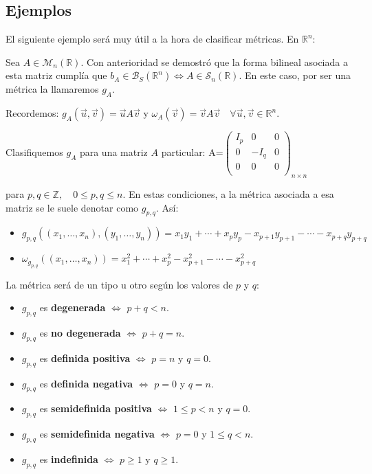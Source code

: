 \documentclass[x11names,table]{report}
\begin{document}
\subsection{Ejemplos}
El siguiente ejemplo será muy útil a la hora de clasificar métricas.
En $\mathbb{R}^n$:

Sea $A\in\mathcal{M}_n(\mathbb{R})$. Con anterioridad se demostró que la forma bilineal asociada a esta matriz cumplía que $b_A\in\mathcal{B}_S(\mathbb{R}^n)\Leftrightarrow A\in\mathcal{S}_n(\mathbb{R})$. En este caso, por ser una métrica la llamaremos $g_A$.

Recordemos: $g_A(\vec{u},\vec{v})=\vec{u}A\vec{v}$ y $\omega_A(\vec{v})=\vec{v}A\vec{v}\quad\forall\vec{u},\vec{v}\in \mathbb{R}^n$.

Clasifiquemos $g_A$ para una matriz $A$ particular:
A=$\left(\begin{array}{c|c|c}
I_p & 0 & 0 \\ \hline
0 & -I_q & 0 \\ \hline
0 & 0 & 0 \\
\end{array}\right)_{n\times n}$

para $p,q\in\mathbb{Z},\quad 0\leq p,q \leq n$. En estas condiciones, a la métrica asociada a esa matriz se le suele denotar como $g_{p,q}$. Así:
\begin{itemize}
\item $g_{p,q}((x_1,\dots,x_n),(y_1,\dots,y_n))=x_1 y_1+\cdots+x_p y_p-x_{p+1} y_{p+1}-\cdots-x_{p+q} y_{p+q}$
\item $\omega_{g_{p,q}}((x_1,\dots,x_n))=x_1^2+\cdots+x_p^2-x_{p+1}^2-\cdots-x_{p+q}^2$
\end{itemize}
La métrica será de un tipo u otro según los valores de $p$ y $q$:
\begin{itemize}
\item $g_{p,q}$ es \textbf{degenerada} $\Leftrightarrow$ $p+q<n$.
\item $g_{p,q}$ es \textbf{no degenerada} $\Leftrightarrow$ $p+q=n$.
\item $g_{p,q}$ es \textbf{definida positiva} $\Leftrightarrow$ $p=n$ y $q=0$.
\item $g_{p,q}$ es \textbf{definida negativa} $\Leftrightarrow$ $p=0$ y $q=n$.
\item $g_{p,q}$ es \textbf{semidefinida positiva} $\Leftrightarrow$ $1\leq p< n$ y $q=0$.
\item $g_{p,q}$ es \textbf{semidefinida negativa} $\Leftrightarrow$ $p=0$ y $1\leq q<n$.
\item $g_{p,q}$ es \textbf{indefinida} $\Leftrightarrow$ $p\geq 1$ y $q\geq 1$.
\end{itemize}
\end{document}
